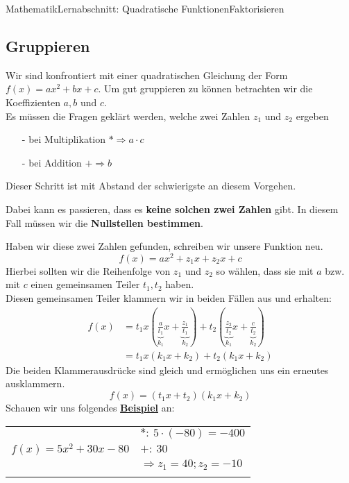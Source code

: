 \documentclass[11pt,twocolumn,oneside,openany,headings=optiontotoc,11pt,numbers=noenddot]{article}
\begin{document}
\begin{worksheet}{Mathematik}{Lernabschnitt: Quadratische Funktionen}{Faktorisieren}
		\subsection{Gruppieren}
		Wir sind konfrontiert mit einer quadratischen Gleichung der Form \(f(x) = ax^2 + bx + c\). Um gut gruppieren zu können betrachten wir die Koeffizienten \(a,b \text{ und } c\).\\
		Es müssen die Fragen geklärt werden, welche zwei Zahlen \(z_1\) und \(z_2\) ergeben
		\begin{itemize}
			\item[-] bei Multiplikation \(*\Rightarrow a\cdot{}c\)
			\item[-] bei Addition \(+\Rightarrow b\)
		\end{itemize}
		Dieser Schritt ist mit Abstand der schwierigste an diesem Vorgehen.
		\begin{framed}
			\noindent
			Dabei kann es passieren, dass es \textbf{keine solchen zwei Zahlen} gibt. In diesem Fall müssen wir die \textbf{Nullstellen bestimmen}.
			\color{red}
		\end{framed}
		\normalcolor
		\noindent
		Haben wir diese zwei Zahlen gefunden, schreiben wir unsere Funktion neu.
		\[f(x) = ax^2 + z_1x + z_2x + c\]
		Hierbei sollten wir die Reihenfolge von \(z_1\) und \(z_2\) so wählen, dass sie mit \(a\) bzw. mit \(c\) einen gemeinsamen Teiler \(t_1, t_2\) haben.\\
		Diesen gemeinsamen Teiler klammern wir in beiden Fällen aus und erhalten:
		\begin{align*}
			f(x) & = t_1x(\underbrace{\frac{a}{t_1}}_{k_1}x + \underbrace{\frac{z_1}{t_1}}_{k_2}) + t_2(\underbrace{\frac{z_2}{t_2}}_{k_1}x + \underbrace{\frac{c}{t_2}}_{k_2})\\
			& = t_1x(k_1x + k_2) + t_2(k_1x+k_2)
		\end{align*}
		Die beiden Klammerausdrücke sind gleich und ermöglichen uns ein erneutes ausklammern.
		\[f(x) = (t_1x+t_2)(k_1x+k_2)\]
		Schauen wir uns folgendes \underline{\textbf{Beispiel}} an:\\
		\par\noindent
		\begin{tabularx}{0.5\textwidth}{X|l}
			\cline{2-2}
			& \(*:\ 5\cdot(-80)=-400\)\\
			\(f(x) = 5x^2 + 30x -80\) & \(+:\ 30\)\\
			& \(\Rightarrow z_1 = 40; z_2 = -10\)\\
			\cline{2-2}
			\multicolumn{2}{l}{}\\

\end{tabularx}
\end{worksheet}
\end{document}
